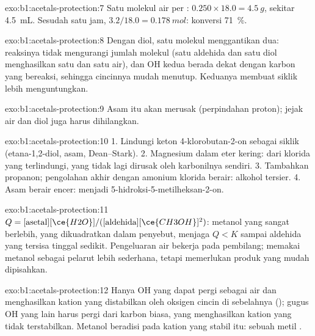 \begin{solution}{exo:b1:acetals-protection:7}
Satu molekul air per : $0.250 \times 18.0 = \qty{4.5}{g}$, sekitar
\qty{4.5}{mL}. Sesudah satu jam, $3.2/18.0 = \qty{0.178}{mol}$: konversi
\qty{71}{\percent}.
\end{solution}

\begin{solution}{exo:b1:acetals-protection:8}
Dengan diol, satu molekul menggantikan dua: reaksinya tidak mengurangi
jumlah molekul (satu aldehida dan satu diol menghasilkan satu  dan
satu air), dan OH kedua berada dekat dengan karbon yang bereaksi, sehingga
cincinnya mudah menutup. Keduanya membuat  siklik lebih
menguntungkan.
\end{solution}

\begin{solution}{exo:b1:acetals-protection:9}
Asam itu akan merusak  (perpindahan proton); jejak air
dan diol juga harus dihilangkan.
\end{solution}

\begin{solution}{exo:b1:acetals-protection:10}
1. Lindungi keton 4-klorobutan-2-on sebagai  siklik (etana-1,2-diol,
 asam, Dean--Stark). 2. Magnesium dalam eter kering:  dari klorida yang terlindungi, yang tidak lagi dirusak oleh
karbonilnya sendiri. 3. Tambahkan propanon; pengolahan akhir dengan
amonium klorida berair: alkohol tersier. 4. Asam berair encer:
 menjadi 5-hidroksi-5-metilheksan-2-on.
\end{solution}

\begin{solution}{exo:b1:acetals-protection:11}
$Q = [\text{asetal}][\ce{H2O}]/([\text{aldehida}][\ce{CH3OH}]^2)$: metanol
yang sangat berlebih, yang dikuadratkan dalam penyebut, menjaga $Q < K$
sampai aldehida yang tersisa tinggal sedikit. Pengeluaran air bekerja
pada pembilang; memakai metanol sebagai pelarut lebih sederhana, tetapi
memerlukan produk yang mudah dipisahkan.
\end{solution}

\begin{solution}{exo:b1:acetals-protection:12}
Hanya OH  yang dapat pergi sebagai air dan menghasilkan kation
yang distabilkan oleh oksigen cincin di sebelahnya (); gugus OH
yang lain harus pergi dari karbon biasa, yang menghasilkan kation yang
tidak terstabilkan. Metanol beradisi pada kation yang stabil itu: sebuah
metil .
\end{solution}


